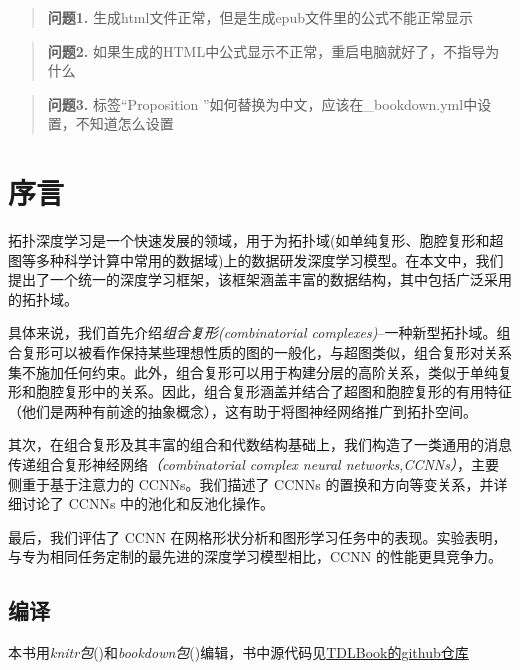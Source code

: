 \documentclass[
  12pt,
]{krantz}
\begin{document}
\begin{quote}
\textbf{问题1.} 生成html文件正常，但是生成epub文件里的公式不能正常显示
\end{quote}

\begin{quote}
\textbf{问题2.}
如果生成的HTML中公式显示不正常，重启电脑就好了，不指导为什么
\end{quote}

\begin{quote}
\textbf{问题3.} 标签``Proposition
''如何替换为中文，应该在\_bookdown.yml中设置，不知道怎么设置
\end{quote}

\section*{序言}\label{ux5e8fux8a00}

拓扑深度学习是一个快速发展的领域，用于为拓扑域(如单纯复形、胞腔复形和超图等多种科学计算中常用的数据域)上的数据研发深度学习模型。在本文中，我们提出了一个统一的深度学习框架，该框架涵盖丰富的数据结构，其中包括广泛采用的拓扑域。

具体来说，我们首先介绍\emph{组合复形(combinatorial
complexes)}--一种新型拓扑域。组合复形可以被看作保持某些理想性质的图的一般化，与超图类似，组合复形对关系集不施加任何约束。此外，组合复形可以用于构建分层的高阶关系，类似于单纯复形和胞腔复形中的关系。因此，组合复形涵盖并结合了超图和胞腔复形的有用特征（他们是两种有前途的抽象概念），这有助于将图神经网络推广到拓扑空间。

其次，在组合复形及其丰富的组合和代数结构基础上，我们构造了一类通用的消息传递组合复形神经网络\emph{（combinatorial
complex neural networks,CCNNs）}，主要侧重于基于注意力的
CCNNs。我们描述了 CCNNs 的置换和方向等变关系，并详细讨论了 CCNNs
中的池化和反池化操作。

最后，我们评估了 CCNN
在网格形状分析和图形学习任务中的表现。实验表明，与专为相同任务定制的最先进的深度学习模型相比，CCNN
的性能更具竞争力。

\subsection*{编译}\label{ux7f16ux8bd1}

本书用\emph{knitr包}()和\emph{bookdown包}()编辑，书中源代码见\href{https://github.com/pyt-team/tdlbook}{TDLBook的github仓库}
\end{document}
